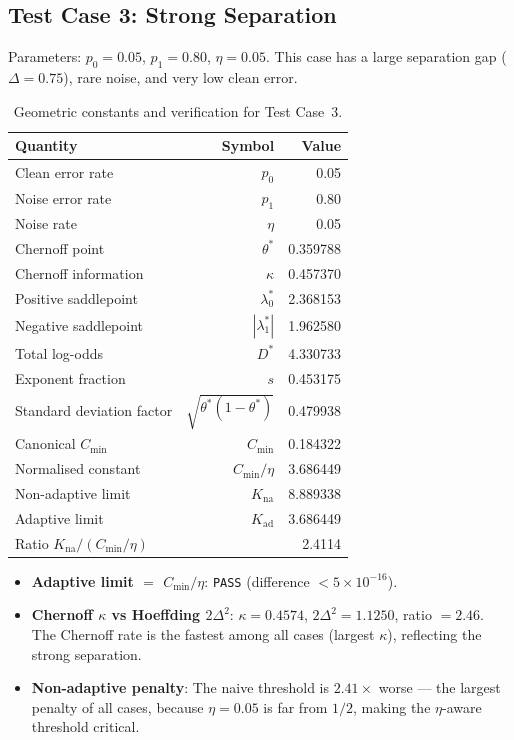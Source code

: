 \documentclass[article]{amsart}
\theoremstyle{definition}
\begin{document}
\subsection{Test Case 3: Strong Separation}

Parameters: $p_0 = 0.05$, $p_1 = 0.80$, $\eta = 0.05$. This case has a large separation gap ($\Delta = 0.75$), rare noise, and very low clean error.

\begin{table}[htbp]
\centering
\caption{Geometric constants and verification for Test Case~3.}
\label{tab:case3}
\begin{tabular}{lrr}
\toprule
Quantity & Symbol & Value \\
\midrule
Clean error rate & $p_0$ & 0.05 \\
Noise error rate & $p_1$ & 0.80 \\
Noise rate & $\eta$ & 0.05 \\
Chernoff point & $\theta^*$ & 0.359788 \\
Chernoff information & $\kappa$ & 0.457370 \\
Positive saddlepoint & $\lambda_0^*$ & 2.368153 \\
Negative saddlepoint & $|\lambda_1^*|$ & 1.962580 \\
Total log-odds & $D^*$ & 4.330733 \\
Exponent fraction & $s$ & 0.453175 \\
Standard deviation factor & $\sqrt{\theta^*(1-\theta^*)}$ & 0.479938 \\
\midrule
Canonical $C_{\min}$ & $C_{\min}$ & 0.184322 \\
Normalised constant & $C_{\min}/\eta$ & 3.686449 \\
Non-adaptive limit & $K_{\mathrm{na}}$ & 8.889338 \\
Adaptive limit & $K_{\mathrm{ad}}$ & 3.686449 \\
Ratio $K_{\mathrm{na}} / (C_{\min}/\eta)$ & & 2.4114 \\
\bottomrule
\end{tabular}
\end{table}

\begin{itemize}
    \item\textbf{Adaptive limit $=$ $C_{\min}/\eta$}: \texttt{PASS} (difference $< 5 \times 10^{-16}$).
    \item\textbf{Chernoff $\kappa$ vs Hoeffding $2\Delta^2$}: $\kappa = 0.4574$, $2\Delta^2 = 1.1250$, ratio $= 2.46$. The Chernoff rate is the fastest among all cases (largest $\kappa$), reflecting the strong separation.
    \item\textbf{Non-adaptive penalty}: The naive threshold is $2.41\times$ worse --- the largest penalty of all cases, because $\eta = 0.05$ is far from $1/2$, making the $\eta$-aware threshold critical.
\end{itemize}
\end{document}

